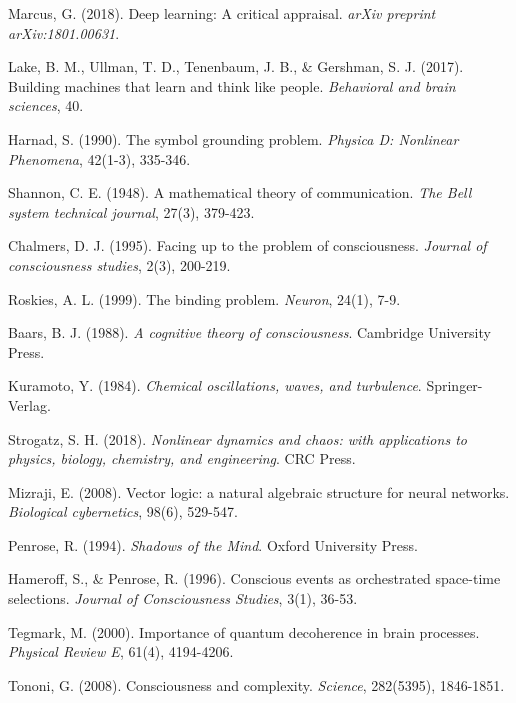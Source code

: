 \documentclass[11pt,twocolumn]{article}
\theoremstyle{remark}
\begin{document}
\begin{thebibliography}{99}

Marcus, G. (2018). Deep learning: A critical appraisal. \textit{arXiv preprint arXiv:1801.00631}.

Lake, B. M., Ullman, T. D., Tenenbaum, J. B., \& Gershman, S. J. (2017). Building machines that learn and think like people. \textit{Behavioral and brain sciences}, 40.

Harnad, S. (1990). The symbol grounding problem. \textit{Physica D: Nonlinear Phenomena}, 42(1-3), 335-346.

Shannon, C. E. (1948). A mathematical theory of communication. \textit{The Bell system technical journal}, 27(3), 379-423.

Chalmers, D. J. (1995). Facing up to the problem of consciousness. \textit{Journal of consciousness studies}, 2(3), 200-219.

Roskies, A. L. (1999). The binding problem. \textit{Neuron}, 24(1), 7-9.

Baars, B. J. (1988). \textit{A cognitive theory of consciousness}. Cambridge University Press.

Kuramoto, Y. (1984). \textit{Chemical oscillations, waves, and turbulence}. Springer-Verlag.

Strogatz, S. H. (2018). \textit{Nonlinear dynamics and chaos: with applications to physics, biology, chemistry, and engineering}. CRC Press.

Mizraji, E. (2008). Vector logic: a natural algebraic structure for neural networks. \textit{Biological cybernetics}, 98(6), 529-547.

Penrose, R. (1994). \textit{Shadows of the Mind}. Oxford University Press.

Hameroff, S., \& Penrose, R. (1996). Conscious events as orchestrated space-time selections. \textit{Journal of Consciousness Studies}, 3(1), 36-53.

Tegmark, M. (2000). Importance of quantum decoherence in brain processes. \textit{Physical Review E}, 61(4), 4194-4206.

Tononi, G. (2008). Consciousness and complexity. \textit{Science}, 282(5395), 1846-1851.


\end{thebibliography}
\end{document}
